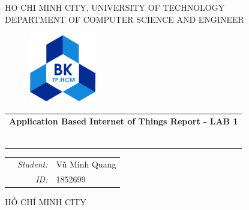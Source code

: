 \documentclass[a4paper,11pt]{article}
\theoremstyle{mytheor}
\begin{document}
\begin{titlepage}
\begin{center}
HO CHI MINH CITY, UNIVERSITY OF TECHNOLOGY \\
DEPARTMENT OF COMPUTER SCIENCE AND ENGINEER
\end{center}

\vspace{1cm}

\begin{figure}[h!]
\begin{center}
\includegraphics[width=3cm]{hcmut.png}
\end{center}
\end{figure}

\vspace{2cm}


\begin{center}
\begin{tabular}{c}
\multicolumn{1}{c}{\textbf{{\Large Application Based Internet of Things Report - LAB 1}}}



~~\\

\\
\multicolumn{1}{l}{\textbf{{\Large}}}\\
\\
\textbf{{\Large}}\\

\\
\\

\end{tabular}
\end{center}

\vspace{3cm}

\begin{table}[h]
\begin{tabular}{rrl}
\hspace{5.1cm} 
&\textit{Student: } & Vũ Minh Quang\\
&\textit{ID: } & 1852699 \\

\end{tabular}
\end{table}
\vspace{3cm}
\begin{center}
{\footnotesize HỒ CHÍ MINH CITY}
\end{center}
\end{titlepage}
\end{document}
